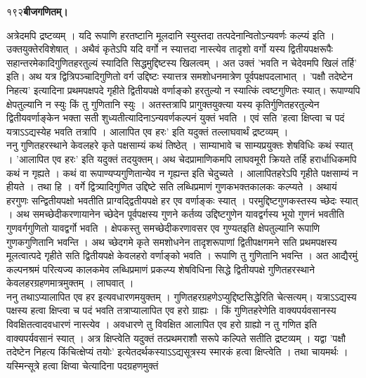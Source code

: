 \documentclass[11pt, openany]{book}
\begin{document}
\onehalfspacing
१९२\hspace{2in}\textbf{बीजगणितम्।} 

\vspace{5mm}
\begin{sloppypar}
\hangindent=0.2in \hspace{0.2in}अत्रेदमपि द्रष्टव्यम् । यदि रूपाणि हरतष्टानि मूलदानि स्युस्तदा तत्पदेनान्वितोऽन्यवर्णः कल्प्यं इति । उक्तयुक्तेरविशेषात् । अथैवं कृतेऽपि यदि वर्गो न स्यात्तदा नास्त्येव तादृशो वर्गो यस्य द्वितीयपक्षरूपैः सहान्तरमेकादिगुणितहरतुल्यं स्यादिति सिद्धमुद्दिष्टस्य खिलत्वम् । अत उक्तं 'भवति न चेदेवमपि खिलं तर्हि' इति। अथ यत्र द्वित्रिपञ्चादिगुणितो वर्ग उद्दिष्टः स्यात्तत्र समशोधनमात्रेण पूर्वपक्षपदलाभात् । 'पक्षौ तदेष्टेन निहत्य' इत्यादिना प्रथमपक्षपदे गृहीते द्वितीयपक्षे वर्णाङ्को हरतुल्यो न स्यात्किं त्वष्टगुणितः स्यात्। रूपाण्यपि क्षेपतुल्यानि न स्युः किं तु गुणितानि स्युः । अतस्तत्रापि प्रागुक्तयुक्त्या यस्य कृतिर्गुणितहरतुल्येन द्वितीयवर्णाङ्केन भक्ता सती शुध्यतीत्यादिनाऽन्यवर्णकल्पनं युक्तं भवति । एवं सति 'हत्वा क्षिप्त्वा च पदं यत्राऽऽद्यस्येह भवति तत्रापि । आलापित एव हरः' इति यदुक्तं तल्लाघवार्थं द्रष्टव्यम् ।\\

\hangindent=0.2in \hspace{0.2in}ननु गुणितहरस्थाने केवलहरे कृते पक्षसाम्यं कथं तिष्ठेत् । साम्याभावे च साम्यप्रयुक्तः शेषविधिः कथं स्यात् । 'आलापित एव हरः' इति यदुक्तं तदयुक्तम्। अथ चेदप्रामाणिकमपि लाघवमूरी क्रियते तर्हि हरार्धाधिकमपि कथं न गृह्यते । कथं वा  रूपाण्यप्यगुणितान्येव न गृह्यन्त इति चेदुच्यते । आलापितहरेऽपि गृहीते पक्षसाम्यं न हीयते । तथा हि । वर्गे द्वित्र्यादिगुणित उद्दिष्टे सति लब्धिप्रमाणं गुणकभक्तकालकः कल्प्यते । अथायं हरगुणः सन्द्वितीयपक्षो भवतीति प्राग्वद्द्वितीयपक्षे हर एव वर्णाङ्कः स्यात् । परमुद्दिष्टगुणकस्तस्य च्छेदः स्यात् । अथ समच्छेदीकरणायानेन च्छेदेन पूर्वपक्षस्य गुणने कर्तव्य उद्दिष्टगुणेन यावद्वर्गस्य भूयो गुणनं भवतीति गुणवर्गगुणितो यावद्वर्गो भवति । क्षेपकस्तु समच्छेदीकरणावसर एव गुण्यतइति क्षेपतुल्यानि रूपाणि गुणकगुणितानि भवन्ति । अथ च्छेदगमे कृते समशोधनेन तादृशरूपाणां द्वितीपक्षगमने सति प्रथमपक्षस्य मूलत्वात्पदे गृहीते सति द्वितीयपक्षे केवलहरो वर्णाङ्को भवति । रूपाणि तु गुणितानि भवन्ति । अत आद्यैरमुं कल्पनश्रमं परित्यज्य कालकमेव लब्धिप्रमाणं प्रकल्प्य शेषविधिना सिद्धे द्वितीयपक्षे गुणितहरस्थाने केवलहरग्रहणमात्रमुक्तम् । लाघवात् ।\\

\hangindent=0.2in \hspace{0.2in}ननु तथाऽप्यालापित एव हर इत्यवधारणमयुक्तम् । गुणितहरग्रहणेऽप्युद्दिष्टसिद्धेरिति चेत्सत्यम्। यत्राऽऽद्यस्य पक्षस्य हत्वा क्षिप्त्वा च पदं भवति तत्राप्यालापित एव हरो ग्राह्यः । किं गुणितहरेणेति वाक्यपर्यवसानस्य विवक्षितत्वादवधारणं नास्त्येव । अवधारणे तु विवक्षित आलापित एव हरो ग्राह्यो न तु गणित इति वाक्यपर्यवसानं स्यात् । अत्र क्षिप्त्वेति यदुक्तं तत्प्रथमराशौ सरूपे कल्पिते सतीति द्रष्टव्यम् । यद्वा 'पक्षौ तदेष्टेन निहत्य किंचित्क्षेप्यं तयोः' इत्येतदर्थकस्याऽऽद्यसूत्रस्य स्मारकं हत्वा क्षिप्त्वेति । तथा चायमर्थः । यस्मिन्सूत्रे हत्वा क्षिप्वा चेत्यादिना पदग्रहणमुक्तं
\end{sloppypar}
\thispagestyle{empty}
\newpage
\end{document}
